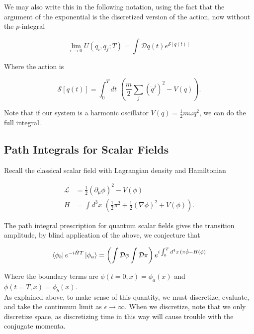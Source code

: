 \noindent We may also write this in the following notation, using the fact that the argument of the exponential is the discretized version of the action, now without the $p$-integral

\begin{equation}
\lim_{\epsilon \rightarrow 0} U(q_i, q_f; T) = \int \mathcal{D} q(t) e^{\mathcal{S}[q(t)]}
\end{equation}

\noindent Where the action is 

\begin{equation}
\mathcal{S}[q(t)] = \int^T_0 dt \,\, (\frac{m}{2} \sum_j (\dot{q}^j)^2 - V(q)).
\end{equation}

\noindent Note that if our system is a harmonic oscillator $V(q) = \frac{1}{2} m \omega q^2$, we can do the full integral.

\subsection*{Path Integrals for Scalar Fields}

\noindent Recall the classical scalar field with Lagrangian density and Hamiltonian

\begin{align}
\mathcal{L} &= \frac{1}{2} (\partial_\mu \phi)^2 - V(\phi) \\
H &= \int d^3 x \,\, (\frac{1}{2} \pi^2 + \frac{1}{2} (\nabla \phi)^2 + V(\phi) ).
\end{align}

\noindent The path integral prescription for quantum scalar fields gives the transition amplitude, by blind application of the above, we conjecture that

\begin{equation}
\bra{\phi_b} e^{-i \hat{H} T} \ket{\phi_a} = \left( \int \mathcal{D} \phi \int \mathcal{D} \pi \right) e^{i \int^T_0 d^4x \, (\pi \dot{\phi} - H(\phi)}
\end{equation}

\noindent Where the boundary terms are $\phi(t=0, x) = \phi_a (x)$ and $\phi(t=T, x) = \phi_b (x)$. \\

\noindent As explained above, to make sense of this quantity, we must discretize, evaluate, and take the continuum limit as $\epsilon \rightarrow \infty$. When we discretize, note that we only discretize space, as discretizing time in this way will cause trouble with the conjugate momenta. \\

